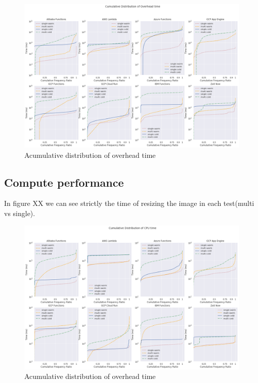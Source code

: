 \documentclass[11pt]{article}
\begin{document}
\begin{figure}[h]
\begin{adjustwidth}{-1.7cm}{}
\includegraphics[width=18cm]{overhead.png}
\centering
\caption{Acumulative distribution of overhead time}
\label{Fig:overhead}
\end{adjustwidth}
\end{figure}


\subsection{Compute performance}

In figure XX we can see strictly the time of resizing the image in each test(multi vs single).


\begin{figure}[h]
\begin{adjustwidth}{-1.7cm}{}
\includegraphics[width=18cm]{cputime.png}
\centering
\caption{Acumulative distribution of overhead time}
\label{Fig:overhead}
\end{adjustwidth}
\end{figure}
\end{document}
